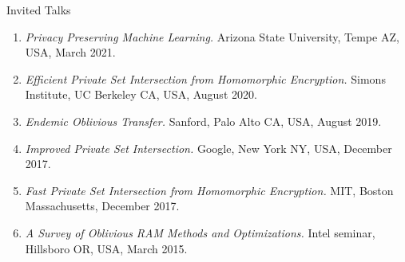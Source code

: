 \documentclass{resume} %
\begin{document}
\begin{rSection}{Invited Talks}
		
	\begin{enumerate}[label=T\arabic* --]
		
		\item \emph{Privacy Preserving Machine Learning.} Arizona State University, Tempe AZ, USA, March 2021.
		
		\item \emph{Efficient Private Set Intersection from Homomorphic Encryption.} Simons Institute, UC Berkeley CA, USA, August 2020.
		
		\item \emph{Endemic Oblivious Transfer.} Sanford, Palo Alto CA, USA, August 2019.
		
		\item \emph{Improved Private Set Intersection.} Google, New York NY, USA, December 2017.
		
		\item  \emph{Fast Private Set Intersection from Homomorphic Encryption.} MIT, Boston Massachusetts, December 2017.
		
		\item \emph{A Survey of Oblivious RAM Methods and Optimizations.} Intel seminar, Hillsboro OR, USA, March 2015.
		
	\end{enumerate}
	
\end{rSection}


\end{document}
